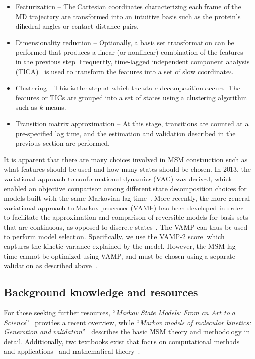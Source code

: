 \documentclass[9pt,tutorial]{livecoms}
\begin{document}
\begin{itemize}
	\item Featurization -- The Cartesian coordinates characterizing each frame of the MD trajectory are transformed into an intuitive basis such as the protein's dihedral angles or contact distance pairs.
	\item Dimensionality reduction -- Optionally, a basis set transformation can be performed that produces a linear (or nonlinear) combination of the features in the previous step.
	Frequently, time-lagged independent component analysis (TICA)~\cite{tica,tica3,tica2,kinetic-maps} is used to transform the features into a set of slow coordinates.
	\item Clustering -- This is the step at which the state decomposition occurs.
	The features or TICs are grouped into a set of states using a clustering algorithm such as $k$-means.
	\item Transition matrix approximation -- At this stage, transitions are counted at a pre-specified lag time, and the estimation and validation described in the previous section are performed.
\end{itemize}

It is apparent that there are many choices involved in MSM construction such as what features should be used and how many states should be chosen.
In 2013, the variational approach to conformational dynamics (VAC) was derived, which enabled an objective comparison among different state decomposition choices for models built with the same Markovian lag time~\cite{noe-vac}.
More recently, the more general variational approach to Markov processes (VAMP) has been developed in order to facilitate the approximation and comparison of reversible models for basis sets that are continuous, as opposed to discrete states~\cite{vamp-preprint}.
The VAMP can thus be used to perform model selection.
Specifically, we use the VAMP-2 score, which captures the kinetic variance explained by the model.
However, the MSM lag time cannot be optimized using VAMP, and must be chosen using a separate validation as described above~\cite{husic2017note}.

\subsection{Background knowledge and resources}
\label{sec:background}

For those seeking further resources, ``\emph{Markov State Models: From an Art to a Science}''~\cite{msm-brooke} provides a recent overview, while ``\emph{Markov models of molecular kinetics: Generation and validation}''~\cite{msm-jhp} describes the basic MSM theory and methodology in detail.
Additionally, two textbooks exist that focus on computational methods and applications~\cite{msm-book} and mathematical theory~\cite{schuette-sarich-book}.
\end{document}
